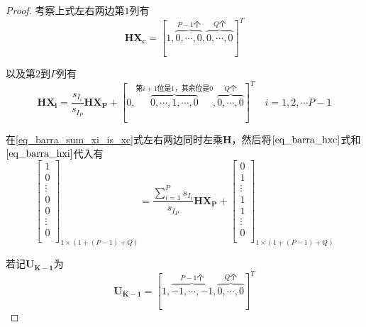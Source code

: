 \begin{proof}
    考察上式左右两边第$1$列有
    \begin{equation}\label{eq_barra_hxc}
        \bm{HX_c} = [1, \overbrace{0,\cdots, 0}^{P-1\text{个}}, \overbrace{0, \cdots, 0}^{Q\text{个}}]^T
    \end{equation}

    以及第$2$到$P$列有
    \begin{equation}\label{eq_barra_hxi}
        \bm{HX_i} =\frac{s_{I_i}}{s_{I_P}}\bm{HX_P} + [0, \overbrace{0,\cdots,1,\cdots, 0}^{\text{第}i+1\text{位是1，其余位是0}}, \overbrace{0, \cdots, 0}^{Q\text{个}}]^T \quad i=1,2,\cdots P-1
    \end{equation}

    在\ref{eq_barra_sum_xi_is_xc}式左右两边同时左乘$\bm{H}$，然后将$\ref{eq_barra_hxc}$式和$\ref{eq_barra_hxi}$代入有
    \begin{equation}
        \left[
            \begin{array}{c}
                1      \\
                0      \\
                \vdots \\
                0      \\
                0      \\
                \vdots \\
                0      \\
            \end{array}
            \right]_{1\times(1 + (P-1) + Q)} =
        \frac{\sum_{i=1}^Ps_{I_i}}{s_{I_P}}\bm{HX_P} +
        \left[
            \begin{array}{c}
                0      \\
                1      \\
                \vdots \\
                1      \\
                1      \\
                \vdots \\
                0      \\
            \end{array}
            \right]_{1\times(1 + (P-1) + Q)}
    \end{equation}

    若记$\bm{U_{K-1}}$为
    \begin{equation}
        \bm{U_{K-1}} = [1, \overbrace{-1,\cdots,-1}^{P-1\text{个}}, \overbrace{0, \cdots, 0}^{Q\text{个}}]^T
    \end{equation}


\end{proof}
